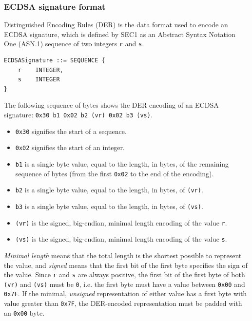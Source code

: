 \documentclass[12pt,a4paper,twoside,openright]{report}
\begin{document}
\subsubsection{ECDSA signature format}

Distinguished Encoding Rules (DER) is the data format used to encode an ECDSA signature, which is defined by SEC1 as an Abstract Syntax Notation One (ASN.1) sequence of two integers \texttt{r} and \texttt{s}.

\begin{lstlisting}[caption={ASN.1 structure of an ECDSA signature},captionpos=b]
ECDSASignature ::= SEQUENCE {
    r    INTEGER,
    s    INTEGER
}
\end{lstlisting}

\noindent
The following sequence of bytes shows the DER encoding of an ECDSA signature: \texttt{0x30 b1 0x02 b2 (vr) 0x02 b3 (vs)}.

\begin{itemize}
\item \texttt{0x30} signifies the start of a sequence.
\item \texttt{0x02} signifies the start of an integer.
\item \texttt{b1} is a single byte value, equal to the length, in bytes, of the remaining sequence of bytes (from the first \texttt{0x02} to the end of the encoding).
\item \texttt{b2} is a single byte value, equal to the length, in bytes, of \texttt{(vr)}.
\item \texttt{b3} is a single byte value, equal to the length, in bytes, of \texttt{(vs)}.
\item \texttt{(vr)} is the signed, big-endian, minimal length encoding of the value \texttt{r}.
\item \texttt{(vs)} is the signed, big-endian, minimal length encoding of the value \texttt{s}.
\end{itemize}

\noindent
\emph{Minimal length} means that the total length is the shortest possible to represent the value, and \emph{signed} means that the first bit of the first byte specifies the sign of the value. Since \texttt{r} and \texttt{s} are always positive, the first bit of the first byte of both \texttt{(vr)} and \texttt{(vs)} must be \texttt{0}, i.e. the first byte must have a value between \texttt{0x00} and \texttt{0x7F}. If the minimal, \emph{unsigned} representation of either value has a first byte with value greater than \texttt{0x7F}, the DER-encoded representation must be padded with an \texttt{0x00} byte.
\end{document}
